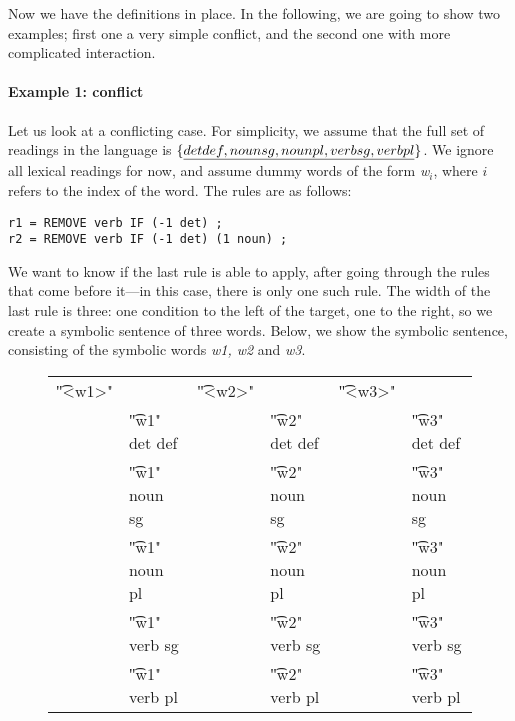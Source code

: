
Now we have the definitions in place. In the following, we are going to show two examples; first one a very simple conflict, and the second one with more complicated interaction.


\paragraph{Example 1: conflict}

Let us look at a conflicting case. For simplicity, we assume that the full set of readings in the language is $\{ \emph{det def, noun sg, noun pl, verb sg, verb pl} \}$. We ignore all lexical readings for now, and assume dummy words of the form \emph{w$_{i}$}, where $i$ refers to the index of the word.
The rules are as follows:


\begin{verbatim}
r1 = REMOVE verb IF (-1 det) ;
r2 = REMOVE verb IF (-1 det) (1 noun) ;
\end{verbatim}


We want to know if the last rule is able to apply, after going through the rules that come before it---in this case, there is only one such rule. 
The width of the last rule is three: one condition to the left of the target, one to the right, so we create a symbolic sentence of three words. Below, we show the symbolic sentence, consisting of the symbolic words {\em w1, w2} and {\em w3}.

\begin{figure}[h]
\centering
\begin{tabular}{p{0.6cm} l  p{0.6cm} l p{0.6cm} l }
\t{"<w1>"}    &                     &  \t{"<w2>"}  &           &  \t{"<w3>"}    \\
              & \t{"w1" det def}    & &      \t{"w2" det def}  & &  \t{"w3" det def} \\
              & \t{"w1" noun sg}    & &      \t{"w2" noun sg}  & &  \t{"w3" noun sg} \\
              & \t{"w1" noun pl}    & &      \t{"w2" noun pl}  & &  \t{"w3" noun pl} \\
              & \t{"w1" verb sg}    & &      \t{"w2" verb sg}  & &  \t{"w3" verb sg} \\
              & \t{"w1" verb pl}    & &      \t{"w2" verb pl}  & &  \t{"w3" verb pl} \\
\end{tabular}
\end{figure}


